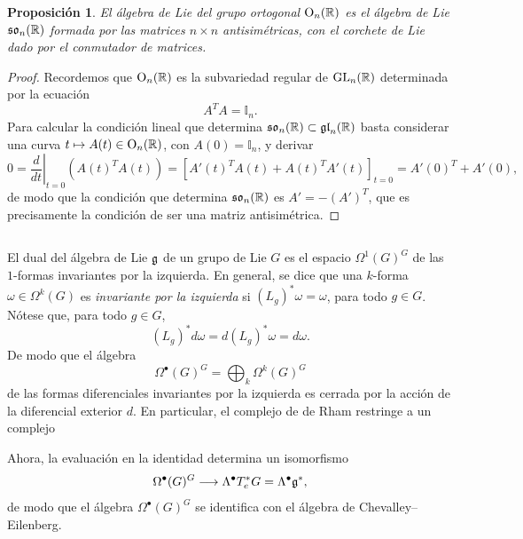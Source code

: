 \documentclass[11pt,a4paper]{amsbook}
\newtheorem{prop}[subsection]{Proposición}
\theoremstyle{remark} \newtheorem{rmk}[subsection]{Observación}
\theoremstyle{definition} \newtheorem{defn}[subsection]{Definición}
\theoremstyle{definition} \newtheorem{ex}[subsection]{Ejemplo}
\theoremstyle{definition} \newtheorem{ej}[subsection]{Ejercicio}
\begin{document}
\begin{prop}
El álgebra de Lie del grupo ortogonal $\operatorname{O}_n(\mathbb R)$ es el álgebra de Lie $\mathfrak{so}_n(\mathbb R)$ formada por las matrices $n\times n$ antisimétricas, con el corchete de Lie dado por el conmutador de matrices.
\end{prop}

\begin{proof}
  Recordemos que $\operatorname{O}_n(\mathbb R)$ es la subvariedad regular de $\operatorname{GL}_n(\mathbb R)$ determinada por la ecuación
  \begin{equation*}
A^T A = \mathbb{I}_n.
  \end{equation*}
  Para calcular la condición lineal que determina $\mathfrak{so}_n(\mathbb R)\subset \mathfrak{gl}_n(\mathbb R)$ basta considerar una curva $t\mapsto A(t) \in \operatorname{O}_n(\mathbb R)$, con $A(0)=\mathbb{I}_n$, y derivar
  \begin{equation*}
0= \left. \frac{d}{dt} \right|_{t=0} (A(t)^T A(t)) = [A'(t)^T A(t) + A(t)^T A'(t)]_{t=0} = A'(0)^T + A'(0)  ,
  \end{equation*}
  de modo que la condición que determina $\mathfrak{so}_n(\mathbb R)$ es $A'=-(A')^T$, que es precisamente la condición de ser una matriz antisimétrica.
\end{proof}

\subsection{} El dual del álgebra de Lie $\mathfrak{g}$ de un grupo de Lie $G$ es el espacio $\Omega^1(G)^G$ de las $1$-formas invariantes por la izquierda. En general, se dice que una $k$-forma $\omega\in \Omega^k(G)$ es \emph{invariante por la izquierda} si $(L_g)^* \omega = \omega$, para todo $g\in G$. Nótese que, para todo $g\in G$,
\begin{equation*}
(L_g)^*d\omega = d (L_g)^* \omega = d\omega.
\end{equation*}
De modo que el álgebra
\begin{equation*}
\Omega^\bullet(G)^G = \bigoplus_{k} \Omega^k(G)^G
\end{equation*}
de las formas diferenciales invariantes por la izquierda es cerrada por la acción de la diferencial exterior $d$. En particular, el complejo de de Rham restringe a un complejo
\begin{center}
\end{center}
Ahora, la evaluación en la identidad determina un isomorfismo
\begin{equation*}
\Omega^\bullet(G)^G \longrightarrow \Lambda^\bullet T^*_eG = \Lambda^\bullet \mathfrak{g}^*,
\end{equation*}
de modo que el álgebra $\Omega^\bullet(G)^G$ se identifica con el álgebra de Chevalley--Eilenberg.
\end{document}
